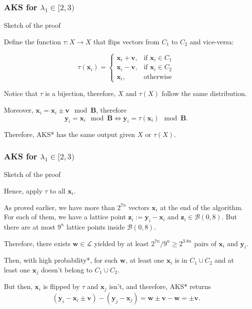 \documentclass[aspectratio=43]{beamer}
\newcommand{\ball}[1]{\mathcal{B}(0, #1)}
\let\vec\mathbf %
\theoremstyle{remark}
\begin{document}
\begin{frame}
\frametitle{AKS for $\lambda_1 \in [2, 3)$}

Sketch of the proof
\vspace*{0.25cm}

Define the function $\tau: X \to X$ that flips vectors from $C_1$ to $C_2$ and 
vice-versa:

\begin{equation*}
\tau(\vec{x}_i) = \begin{cases}
               \vec{x}_i + \vec{v},    & \text{if } \vec{x}_i \in C_1\\
               \vec{x}_i - \vec{v},    & \text{if } \vec{x}_i \in C_2\\
               \vec{x}_i,              & \text{otherwise}
           \end{cases}
\end{equation*}

Notice that $\tau$ is a bijection, therefore, $X$ and $\tau(X)$ follow the same 
distribution.

Moreover, $\vec{x}_i = \vec{x}_i \pm \vec{v} \mod \vec B$, therefore 
$$\vec{y}_i = \vec{x}_i \mod \vec B \Leftrightarrow \vec{y}_i = \tau(\vec{x}_i) 
\mod \vec B.$$

Therefore, {\sc AKS*} has the same output given $X$ or $\tau(X)$.
\end{frame}


\begin{frame}
\frametitle{AKS for $\lambda_1 \in [2, 3)$}

Sketch of the proof
\vspace*{0.25cm}

Hence, apply $\tau$ to all $\vec{x}_i$.

As proved earlier, we have more than $2^{7n}$ vectors $\vec{x}_i$ at the end of 
the algorithm. For each of them, we have a lattice point $\vec{z}_i := 
\vec{y}_i - \vec{x}_i$ and $\vec{z}_i \in \ball{8}$. But there are at most 
$9^{n}$ lattice points inside $\ball{8}$.

Therefore, there exists $\vec{w} \in \mathcal{L}$ yielded by at least $2^{7n} / 
9^n \ge 2^{3.8n}$ pairs of $\vec{x}_i$ and $\vec{y}_i$.

Then, with high probability*, for such $\vec{w}$, at least one $\vec{x}_i$ is 
in 
$C_1 \cup C_2$ and at least one $\vec{x}_j$ doesn't belong to $C_1 \cup C_2$.

But then, $\vec{x}_i$ is flipped by $\tau$ and $\vec{x}_j$ isn't, and 
therefore, {\sc AKS*} returns 
$$(\vec{y}_i - \vec{x}_i \pm \vec{v}) - (\vec{y}_j - \vec{x}_j) = \vec{w} \pm 
\vec{v} - \vec{w} = \pm \vec{v}.$$



\end{frame}
\end{document}
